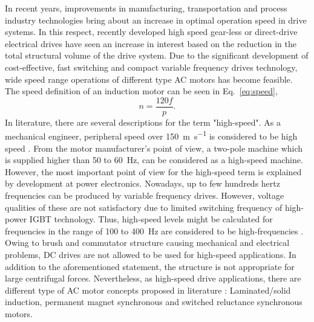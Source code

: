 In recent years, improvements in manufacturing, transportation and process industry
technologies bring about an increase in optimal operation speed in drive systems. In this
respect, recently developed high speed gear-less or direct-drive electrical drives have seen an
increase in interest based on the reduction in the total structural volume of the drive
system. Due to the significant development of cost-effective, fast switching and compact
variable frequency drives technology, wide speed range operations of different type AC motors
has become feasible. The speed definition of an induction motor can be seen in
Eq.~\ref{eq:speed},
%
\begin{equation}  \label{eq:speed}
  n = \frac{120 f}{p}.
\end{equation}
%
In literature, there are several descriptions for the term "high-speed".  As a mechanical
engineer, peripheral speed over \SI{150}{\meter\per\second} is considered to be high speed
\cite{gieras2011performance}. From the motor manufacturer's point of view, a two-pole machine
which is supplied higher than 50 to \SI{60}{\hertz}, can be considered as a high-speed machine.
However, the most important point of view for the high-speed term is explained by development
at power electronics. Nowadays, up to few hundreds hertz frequencies can be produced by
variable frequency drives. However, voltage qualities of these are not satisfactory due to
limited switching frequency of high-power IGBT technology. Thus, high-speed levels might be
calculated for frequencies in the range of 100 to \SI{400}{\hertz} are considered to be
high-frequencies \cite{pyrhonen1991high}.  Owing to brush and commutator structure causing mechanical and
electrical problems, DC drives are not allowed to be used for high-speed applications. In
addition to the aforementioned statement, the structure is not appropriate for large
centrifugal forces.  Nevertheless, as high-speed drive applications, there are different type
of AC motor concepts proposed in literature
\cite{gieras2011performance, pyrhonen1991high, lahteenmaki2002design, saari1998thermal}:
Laminated/solid induction, permanent
magnet synchronous and switched reluctance synchronous motors.


